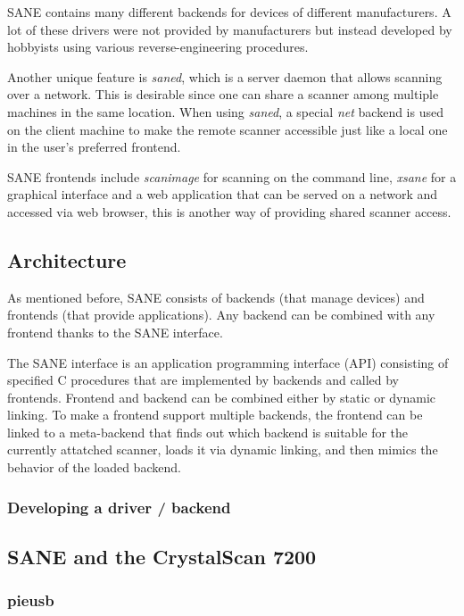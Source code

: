 \documentclass{article}
\begin{document}
SANE contains many different backends for devices of different manufacturers.
A lot of these drivers were not provided by manufacturers but instead
developed by hobbyists using various reverse-engineering procedures.

Another unique feature is {\it saned}, which is a server daemon that allows
scanning over a network. This is desirable since one can share a scanner
among multiple machines in the same location. When using {\it saned}, a
special {\it net} backend is used on the client machine to make
the remote scanner accessible just like a local one in the user's preferred frontend.

SANE frontends include {\it scanimage} for scanning on the command line,
{\it xsane} for a graphical interface and a web application that can be served
on a network and accessed via web browser, this is another way of providing shared
scanner access.

\subsection{Architecture}

As mentioned before, SANE consists of backends (that manage devices) and frontends
(that provide applications). Any backend can be combined with any frontend
thanks to the SANE interface.

The SANE interface is an application programming interface (API) consisting
of specified C procedures that are implemented by backends and called by frontends.
Frontend and backend can be combined either by static or dynamic linking.
To make a frontend support multiple backends, the frontend can be linked to a
meta-backend that finds out which backend is suitable for the currently attatched
scanner, loads it via dynamic linking, and then mimics the behavior
of the loaded backend.



\subsubsection{Developing a driver / backend}

\subsection{SANE and the CrystalScan 7200}

\subsubsection{pieusb}
\end{document}
